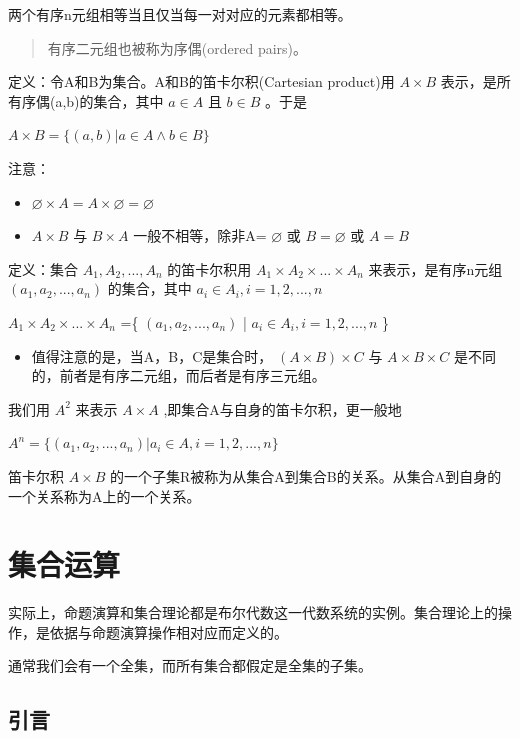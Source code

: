 \documentclass[12pt,a4paper,oneside]{ctexart}
\begin{document}
两个有序n元组相等当且仅当每一对对应的元素都相等。

\begin{quote}
有序二元组也被称为序偶(ordered pairs)。
\end{quote}

定义：令A和B为集合。A和B的笛卡尔积(Cartesian product)用 \(A\times B\) 表示，是所有序偶(a,b)的集合，其中 \(a\in A\) 且 \(b\in B\) 。于是

\(A\times B=\{(a,b)|a\in A\wedge b\in B\}\)

注意：

\begin{itemize}
\item
  \(\varnothing\times A=A\times\varnothing=\varnothing\)
\item
  \(A\times B\) 与 \(B\times A\) 一般不相等，除非A= \(\varnothing\) 或 \(B=\varnothing\) 或 \(A=B\)
\end{itemize}

定义：集合 \(A_1,A_2,...,A_n\) 的笛卡尔积用 \(A_1\times A_2\times...\times A_n\) 来表示，是有序n元组 \((a_1,a_2,...,a_n)\) 的集合，其中 \(a_i\in A_i,i=1,2,...,n\)

\(A_1\times A_2\times...\times A_n\) =\{ \((a_1,a_2,...,a_n)\) | \(a_i\in A_i,i=1,2,...,n\) \}

\begin{itemize}
\item
  值得注意的是，当A，B，C是集合时， \((A\times B)\times C\) 与 \(A\times B\times C\) 是不同的，前者是有序二元组，而后者是有序三元组。
\end{itemize}

我们用 \(A^2\) 来表示 \(A\times A\) ,即集合A与自身的笛卡尔积，更一般地

\(A^n=\{(a_1,a_2,...,a_n)|a_i\in A,i=1,2,...,n\}\)

笛卡尔积 \(A\times B\) 的一个子集R被称为从集合A到集合B的关系。从集合A到自身的一个关系称为A上的一个关系。

\section*{集合运算}

实际上，命题演算和集合理论都是布尔代数这一代数系统的实例。集合理论上的操作，是依据与命题演算操作相对应而定义的。

通常我们会有一个全集，而所有集合都假定是全集的子集。

\subsection*{引言}
\end{document}

